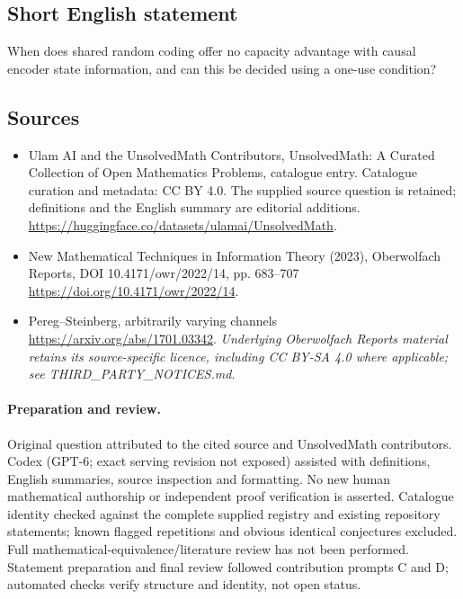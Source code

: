 \documentclass[11pt]{article}
\begin{document}
\subsection{Short English statement}
When does shared random coding offer no capacity advantage with causal encoder state information, and can this be decided using a one-use condition?
\subsection{Sources}
\begin{itemize}
\item[\hypertarget{source:statement:1}{S1}] Ulam AI and the UnsolvedMath Contributors, UnsolvedMath: A Curated Collection of Open Mathematics Problems, catalogue entry. Catalogue curation and metadata: CC BY 4.0. The supplied source question is retained; definitions and the English summary are editorial additions.
\url{https://huggingface.co/datasets/ulamai/UnsolvedMath}.
\item[\hypertarget{source:statement:2}{S2}] New Mathematical Techniques in Information Theory (2023), Oberwolfach Reports, DOI 10.4171/owr/2022/14, pp. 683--707
\url{https://doi.org/10.4171/owr/2022/14}.
\item[\hypertarget{source:statement:3}{S3}] Pereg--Steinberg, arbitrarily varying channels
\url{https://arxiv.org/abs/1701.03342}.
\textit{Underlying Oberwolfach Reports material retains its source-specific licence, including CC BY-SA 4.0 where applicable; see THIRD\_PARTY\_NOTICES.md.}
\end{itemize}
\paragraph{Preparation and review.}
Original question attributed to the cited source and UnsolvedMath contributors. Codex (GPT-6; exact serving revision not exposed) assisted with definitions, English summaries, source inspection and formatting. No new human mathematical authorship or independent proof verification is asserted. Catalogue identity checked against the complete supplied registry and existing repository statements; known flagged repetitions and obvious identical conjectures excluded. Full mathematical-equivalence/literature review has not been performed. Statement preparation and final review followed contribution prompts C and D; automated checks verify structure and identity, not open status.
\label{end:statement}
\end{document}
